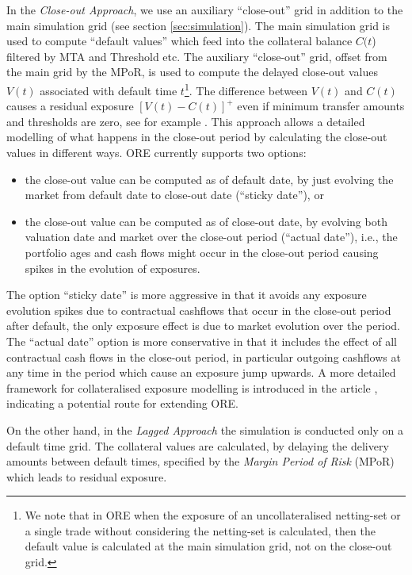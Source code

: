 \documentclass[12pt, a4paper]{article}
\begin{document}
{\begin{appendix}
\medskip In the {\em Close-out Approach}, we use an auxiliary ``close-out'' grid in addition to the main simulation grid (see section \ref{sec:simulation}). The main simulation grid is used to compute “default values” which feed into the collateral balance $C(t$) filtered by MTA and Threshold etc. The auxiliary “close-out” grid, offset from the main grid by the MPoR, is used to compute the delayed close-out values $V(t)$ associated with default time $t$\footnote{We note that in ORE when the exposure of an uncollateralised netting-set or a single trade without considering the netting-set is calculated, then the default value is calculated at the main simulation grid, not on the close-out grid.}. The difference between $V(t)$ and $C(t)$ causes a residual exposure $[V (t)-C(t)]^+$ even if minimum transfer amounts and thresholds are zero, see for example \cite{Pykhtin2010}. This approach allows a detailed modelling of what happens in the close-out period by calculating the close-out values in different ways. ORE currently supports two options: 
%
\begin{itemize}
\item the close-out value can be computed as of default date, by just evolving the market from default date to close-out date (“sticky date”), or
\item the close-out value can be computed as of close-out date, by evolving both valuation date and market over the close-out period (“actual date”), i.e., the portfolio ages and cash flows might occur in the close-out period causing spikes in the evolution of exposures.
\end{itemize}

The option ``sticky date'' is more aggressive in that it avoids any exposure evolution spikes due to contractual cashflows that occur in the close-out period after default, the only exposure effect is due to market evolution over the period. The ``actual date'' option is more conservative in that it includes the effect of all contractual cash flows in the close-out period, in particular outgoing cashflows at any time in the period which cause an exposure jump upwards. A more detailed framework for collateralised exposure modelling is introduced in the article \cite{Andersen2016}, indicating a potential route for extending ORE.

\medskip On the other hand, in the {\em Lagged Approach} the simulation is conducted only on a default time grid. The collateral values are calculated, by delaying the delivery amounts between default times, specified by the {\em Margin Period of Risk} (MPoR) which leads to residual exposure. 


\end{appendix}}
\end{document}
